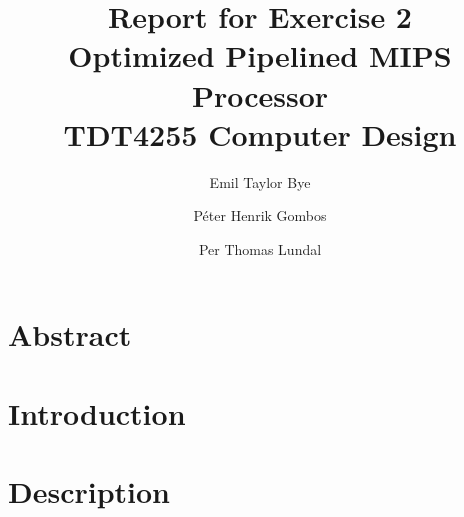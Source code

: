 \documentclass[a4paper]{article}
\begin{document}

\newcommand{\todo}[1]{\large \textbf{\textcolor{red}{TODO : #1}}}

\title{Report for Exercise 2\\Optimized Pipelined MIPS Processor\\\vspace{2mm}\Large{TDT4255 Computer Design}}

\author{Emil Taylor Bye \and Péter Henrik Gombos \and Per Thomas Lundal}



\maketitle


\bigskip
\bigskip
\bigskip
\bigskip

\section*{Abstract}



\clearpage

\tableofcontents

\clearpage

\listoffigures


\clearpage

\setcounter{page}{1}

\section{Introduction}



\clearpage

\section{Description}


\end{document}
